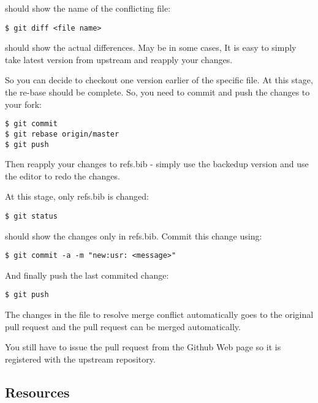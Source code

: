 should show the name of the conflicting file:

\begin{verbatim}
$ git diff <file name>
\end{verbatim}

should show the actual differences. May be in some cases, It is easy to
simply take latest version from upstream and reapply your changes.

So you can decide to checkout one version earlier of the specific file.
At this stage, the re-base should be complete. So, you need to commit
and push the changes to your fork:

\begin{verbatim}
$ git commit
$ git rebase origin/master
$ git push
\end{verbatim}

Then reapply your changes to refs.bib - simply use the backedup version
and use the editor to redo the changes.

At this stage, only refs.bib is changed:

\begin{verbatim}
$ git status
\end{verbatim}

should show the changes only in refs.bib. Commit this change using:

\begin{verbatim}
$ git commit -a -m "new:usr: <message>"
\end{verbatim}

And finally push the last commited change:

\begin{verbatim}
$ git push
\end{verbatim}

The changes in the file to resolve merge conflict automatically goes to
the original pull request and the pull request can be merged
automatically.

You still have to issue the pull request from the Github Web page so it
is registered with the upstream repository.

\subsection{Resources}

